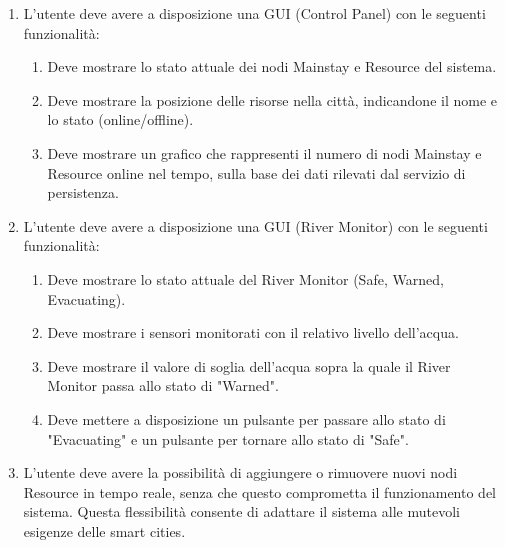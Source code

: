 \documentclass{scrartcl}
\begin{document}
\begin{enumerate}
    \item L'utente deve avere a disposizione una GUI (Control Panel) con le seguenti funzionalità:
          \begin{enumerate}
              \item Deve mostrare lo stato attuale dei nodi Mainstay e Resource del sistema.
              \item Deve mostrare la posizione delle risorse nella città, indicandone il nome e lo stato (online/offline).
              \item Deve mostrare un grafico che rappresenti il numero di nodi Mainstay e Resource online nel tempo, sulla base dei dati rilevati
                    dal servizio di persistenza.
          \end{enumerate}
    \item L'utente deve avere a disposizione una GUI (River Monitor) con le seguenti funzionalità:
          \begin{enumerate}
              \item Deve mostrare lo stato attuale del River Monitor (Safe, Warned, Evacuating).
              \item Deve mostrare i sensori monitorati con il relativo livello dell'acqua.
              \item Deve mostrare il valore di soglia dell'acqua sopra la quale il River Monitor passa allo stato di "Warned".
              \item Deve mettere a disposizione un pulsante per passare allo stato di "Evacuating" e un pulsante per tornare allo stato di "Safe".
          \end{enumerate}
    \item L'utente deve avere la possibilità di aggiungere o rimuovere nuovi nodi Resource in tempo reale, senza che questo comprometta il funzionamento del sistema. Questa flessibilità consente di adattare il sistema alle mutevoli esigenze delle smart cities.
\end{enumerate}
\end{document}

